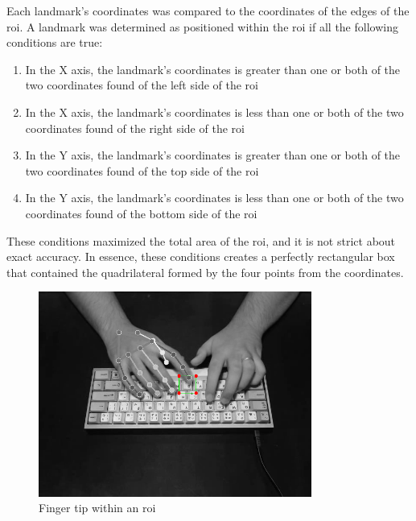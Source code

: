 \documentclass{report}
\begin{document}
Each landmark's coordinates was compared to the coordinates of the edges of the
\ac{roi}. A landmark was determined as positioned within the \ac{roi} if all the
following conditions are true:
\begin{enumerate}
	\item In the X axis, the landmark's coordinates is greater than one or both of
	      the two coordinates found of the left side of the \ac{roi}
	\item In the X axis, the landmark's coordinates is less than one or both of
	      the two coordinates found of the right side of the \ac{roi}
	\item In the Y axis, the landmark's coordinates is greater than one or both of
	      the two coordinates found of the top side of the \ac{roi}
	\item In the Y axis, the landmark's coordinates is less than one or both of
	      the two coordinates found of the bottom side of the \ac{roi}
\end{enumerate}

These conditions maximized the total area of the \ac{roi}, and it is not strict
about exact accuracy. In essence, these conditions creates a perfectly
rectangular box that contained the quadrilateral formed by the four points from
the coordinates.

\begin{figure}[H]
	\centering
	\includegraphics[width=0.8\textwidth]{detected-finger.png}
	\caption{Finger tip within an \ac{roi}}
	\centering
\end{figure}
\end{document}
